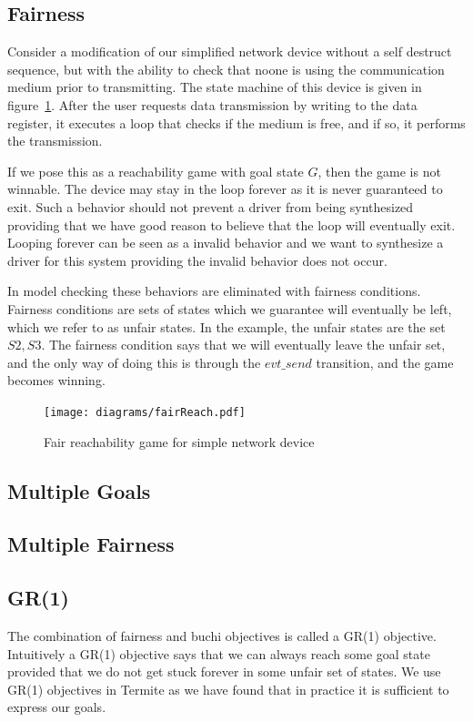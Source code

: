 \subsection{Fairness}

Consider a modification of our simplified network device without a self destruct sequence, but with the ability to check that noone is using the communication medium prior to transmitting. The state machine of this device is given in figure~\ref{fig:fair}. After the user requests data transmission by writing to the data register, it executes a loop that checks if the medium is free, and if so, it performs the transmission. 

If we pose this as a reachability game with goal state $G$, then the game is not winnable. The device may stay in the loop forever as it is never guaranteed to exit. Such a behavior should not prevent a driver from being synthesized providing that we have good reason to believe that the loop will eventually exit. Looping forever can be seen as a invalid behavior and we want to synthesize a driver for this system providing the invalid behavior does not occur. 

In model checking these behaviors are eliminated with fairness conditions. Fairness conditions are sets of states which we guarantee will eventually be left, which we refer to as unfair states. In the example, the unfair states are the set ${S2, S3}$. The fairness condition says that we will eventually leave the unfair set, and the only way of doing this is through the $evt\_send$ transition, and the game becomes winning.

\begin{figure}[t]
\centering
\texttt{[image: diagrams/fairReach.pdf]}
\caption{Fair reachability game for simple network device}
\label{fig:fair}
\end{figure}

\subsection{Multiple Goals}

\subsection{Multiple Fairness}

\subsection{GR(1)}

The combination of fairness and buchi objectives is called a GR(1) objective. Intuitively a GR(1) objective says that we can always reach some goal state provided that we do not get stuck forever in some unfair set of states. We use GR(1) objectives in Termite as we have found that in practice it is sufficient to express our goals.

